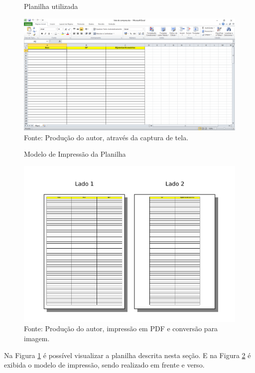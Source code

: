 \documentclass[
	draft,
	12pt,
	openright,
	oneside, %
	a4paper,
	chapter=TITLE,
	section=TITLE,
	english,
	brazil %
	]{abntex2-udesc}
\begin{document}
\begin{figure}[h]
\caption{Planilha utilizada}\label{fig:planilha}
\centering
\includegraphics[width=\textwidth,keepaspectratio]{figures/lista-excel.pdf}
\caption*{\footnotesize Fonte: Produção do autor, através da captura de tela.}
\end{figure}

\begin{figure}[h]
\caption{Modelo de Impressão da Planilha}\label{fig:impressao}
\centering
\includegraphics[width=\textwidth,keepaspectratio]{figures/modelo-impressao.pdf}
\caption*{\footnotesize Fonte: Produção do autor, impressão em PDF e conversão para imagem.}
\end{figure}


Na Figura \ref{fig:planilha} é possível visualizar a planilha descrita nesta seção. E na Figura \ref{fig:impressao} é exibida o modelo de impressão, sendo realizado em frente e verso.

\postextual



\end{document}
